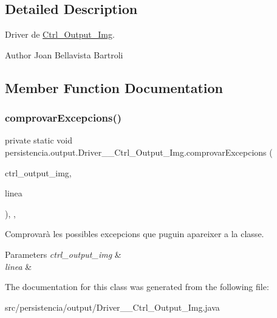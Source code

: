 \subsection{Detailed Description}
Driver de \hyperlink{classpersistencia_1_1output_1_1Ctrl__Output__Img}{Ctrl\+\_\+\+Output\+\_\+\+Img}. 

\begin{DoxyAuthor}{Author}
Joan Bellavista Bartroli 
\end{DoxyAuthor}


\subsection{Member Function Documentation}
\mbox{\label{classpersistencia_1_1output_1_1Driver____Ctrl__Output__Img_ab6af9c875a2582dbb7e466be9bb6bbbb}} 
\subsubsection{\texorpdfstring{comprovar\+Excepcions()}{comprovarExcepcions()}}
{\footnotesize\ttfamily private static void persistencia.\+output.\+Driver\+\_\+\+\_\+\+Ctrl\+\_\+\+Output\+\_\+\+Img.\+comprovar\+Excepcions (\begin{DoxyParamCaption}\item[{\hyperlink{classpersistencia_1_1output_1_1Ctrl__Output__Img}{Ctrl\+\_\+\+Output\+\_\+\+Img}}]{ctrl\+\_\+output\+\_\+img,  }\item[{String}]{linea }\end{DoxyParamCaption})\hspace{0.3cm}{\ttfamily [inline]}, {\ttfamily [static]}, {\ttfamily [private]}}



Comprovarà les possibles excepcions que puguin apareixer a la classe. 


\begin{DoxyParams}{Parameters}
{\em ctrl\+\_\+output\+\_\+img} & \\
\hline
{\em linea} & \\
\hline
\end{DoxyParams}


The documentation for this class was generated from the following file\+:\begin{DoxyCompactItemize}
\item 
src/persistencia/output/Driver\+\_\+\+\_\+\+Ctrl\+\_\+\+Output\+\_\+\+Img.\+java\end{DoxyCompactItemize}
